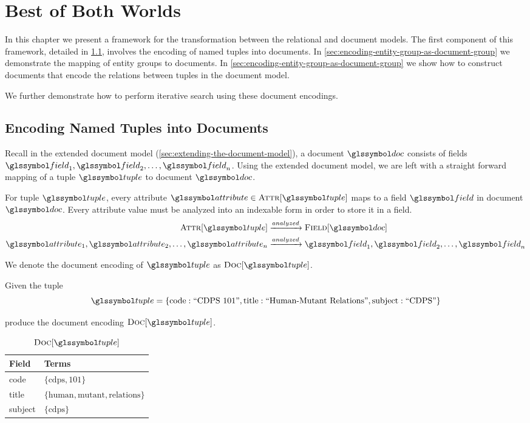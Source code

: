 \chapter{Best of Both Worlds}
\label{chap:best-of-both-worlds}
	In this chapter we present a framework for the transformation between the relational and document models.  The first component of this framework, detailed in \cref{sec:named-tuples-documents}, involves the encoding of named tuples into documents.  In \cref{sec:encoding-entity-group-as-document-group} we demonstrate the mapping of entity groups to documents.  In \cref{sec:encoding-entity-group-as-document-group} we show how to construct documents that encode the relations between tuples in the document model.
	
	We further demonstrate how to perform iterative search using these document encodings.
	
	\section{Encoding Named Tuples into Documents}
	\label{sec:named-tuples-documents}
		Recall in the extended document model (\vref{sec:extending-the-document-model}), a document \(\doc\) consists of fields \(\field_1, \field_2, \dotsc, \field_n\).  Using the extended document model, we are left with a straight forward mapping of a tuple \(\tuple\) to document \(\doc\).
		
		For tuple \(\tuple\), every attribute \(\attribute \in \attributes{\tuple}\) maps to a field \(\field\) in document \(\doc\).	Every attribute value must be analyzed into an indexable form in order to store it in a field.
		\begin{align}
			\attributes{\tuple} &\xrightarrow{analyzed} \fields{\doc} \\
			\attribute_1, \attribute_2, \dotsc, \attribute_n &\xrightarrow{analyzed} \field_1, \field_2, \dotsc, \field_n
		\end{align}
		
		We denote the document encoding of \(\tuple\) as \(\docs{\tuple}\).
		
		\begin{ex}
			Given the tuple
			\[
				\tuple = \{\text{code}: \text{``CDPS 101''}, \text{title}: \text{``Human-Mutant Relations''}, \text{subject}: \text{``CDPS''}\}
			\]
			
			produce the document encoding \(\docs{\tuple}\).
			
			\begin{table}[H]
				\centering
				
				\begin{tabular}{ll}
					\toprule
					Field & Terms \\
					\midrule
					code & \(\{\text{cdps}, \text{101}\}\) \\
					title & \(\{\text{human}, \text{mutant}, \text{relations}\}\) \\
					subject & \(\{\text{cdps}\}\) \\
					\bottomrule
				\end{tabular}
				
				\caption{\(\docs{\tuple}\)}
			\end{table}
		\end{ex}

